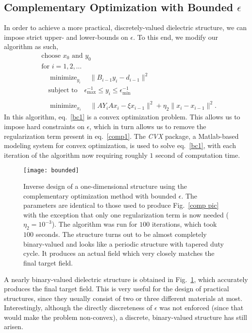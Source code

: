 \documentclass[10pt,letterpaper]{article}
\DeclareMathOperator*{\minimize}{minimize}
\begin{document}
\subsection{Complementary Optimization with Bounded $\epsilon$}
In order to achieve a more practical, discretely-valued dielectric structure, we can impose strict upper- and lower-bounds on $\epsilon$. To this end, we modify our algorithm as such,
\begin{align}
&\text{choose $x_0$ and $y_0$} \nonumber \\
&\text{for } i = 1, 2, \ldots \nonumber \\
&\quad\minimize_{y_i}\quad \|B_{i-1} y_i-d_{i-1}\|^2 \nonumber \\
&\quad\text{subject to}\quad \epsilon_\text{max}^{-1} \leq y_i \leq \epsilon_\text{min}^{-1} \label{bc1} \\
\nonumber \\
&\quad\minimize_{x_i}\quad \|A Y_i A x_i - \xi x_{i-1}\|^2 + \eta_2\|x_i-x_{i-1}\|^2. \label{bc2}
\end{align}
In this algorithm, eq.~\eqref{bc1} is a convex optimization problem\cite{BV04}. This allows us to impose hard constraints on $\epsilon$, which in turn allows us to remove the regularization term present in eq.~\eqref{comp1}. The \emph{CVX} package\cite{CVX}, a Matlab-based modeling system for convex optimization, is used to solve eq.~\eqref{bc1}, with each iteration of the algorithm now requiring roughly $1$ second of computation time.
\begin{figure}[htbp]\centering
\texttt{[image: bounded]}
\caption{Inverse design of a one-dimensional structure using the complementary optimization method with bounded $\epsilon$. The parameters are identical to those used to produce Fig.~\ref{comp pic} with the exception that only one regularization term is now needed ($\eta_2=10^{-3}$). The algorithm was run for $100$ iterations, which took $100$ seconds. The structure turns out to be almost completely binary-valued and looks like a periodic structure with tapered duty cycle. It produces an actual field which very closely matches the final target field.}
\label{bounded comp pic}
\end{figure}

A nearly binary-valued dielectric structure is obtained in Fig.~\ref{bounded comp pic}, which accurately produces the final target field. This is very useful for the design of practical structures, since they usually consist of two or three different materials at most. Interestingly, although the directly discreteness of $\epsilon$ was not enforced (since that would make the problem non-convex), a discrete, binary-valued structure has still arisen. 
\end{document}
